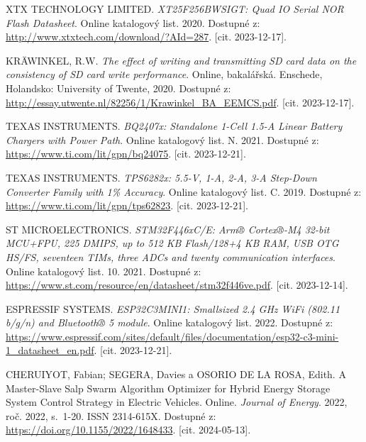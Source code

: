 \begin{thebibliography}{99}
XTX TECHNOLOGY LIMITED. \textit{XT25F256BWSIGT: Quad IO Serial NOR Flash Datasheet}. Online katalogový list. 2020. Dostupné z: \url{http://www.xtxtech.com/download/?AId=287}. [cit. 2023-12-17].

KRÄWINKEL, R.W. \textit{The effect of writing and transmitting SD card data on the consistency of SD card write performance}. Online, bakalářská. Enschede, Holandsko: University of Twente, 2020. Dostupné z: \url{http://essay.utwente.nl/82256/1/Krawinkel\_BA\_EEMCS.pdf}. [cit. 2023-12-17].

TEXAS INSTRUMENTS. \textit{BQ2407x: Standalone 1-Cell 1.5-A Linear Battery Chargers with Power Path}. Online katalogový list. N. 2021. Dostupné z: \url{https://www.ti.com/lit/gpn/bq24075}. [cit. 2023-12-21].

TEXAS INSTRUMENTS. \textit{TPS6282x: 5.5-V, 1-A, 2-A, 3-A Step-Down Converter Family with 1\% Accuracy}. Online katalogový list. C. 2019. Dostupné z: \url{https://www.ti.com/lit/gpn/tps62823}. [cit. 2023-12-21].

ST MICROELECTRONICS. \textit{STM32F446xC/E: Arm® Cortex®-M4 32-bit MCU+FPU, 225 DMIPS, up to 512 KB Flash/128+4 KB RAM, USB OTG HS/FS, seventeen TIMs, three ADCs and twenty communication interfaces}. Online katalogový list. 10. 2021. Dostupné z: \url{https://www.st.com/resource/en/datasheet/stm32f446ve.pdf}. [cit. 2023-12-14].

ESPRESSIF SYSTEMS. \textit{ESP32C3MINI1: Smallsized 2.4 GHz WiFi (802.11 b/g/n) and Bluetooth® 5 module}. Online katalogový list. 2022. Dostupné z: \url{https://www.espressif.com/sites/default/files/documentation/esp32-c3-mini-1\_datasheet\_en.pdf}. [cit. 2023-12-21].

CHERUIYOT, Fabian; SEGERA, Davies a OSORIO DE LA ROSA, Edith. A Master-Slave Salp Swarm Algorithm Optimizer for Hybrid Energy Storage System Control Strategy in Electric Vehicles. Online. \textit{Journal of Energy}. 2022, roč. 2022, s.~1-20. ISSN 2314-615X. Dostupné z: \url{https://doi.org/10.1155/2022/1648433}. [cit. 2024-05-13].

\end{thebibliography}